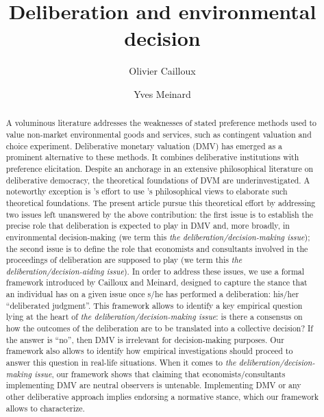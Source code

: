 \documentclass[version=last, pagesize, twoside=off, bibliography=totoc, DIV=calc, fontsize=14pt, a4paper, french, english]{scrartcl}
\newcommand{\institute}[1]{}
\newcommand{\keywords}[1]{}
\begin{document}
\title{Deliberation and environmental decision}
\author{Olivier Cailloux \and Yves Meinard}
\institute{
	Olivier Cailloux 
	\and
	Yves Meinard 
	\at 
	Université Paris-Dauphine, \\
	PSL Research University, \\
	CNRS, \\
	LAMSADE\\
	75016 PARIS, FRANCE\\
	\email{olivier.cailloux@dauphine.fr}
}
\makeatletter
\makeatother
\maketitle

\keywords{decision aid, justification, empirical validation, methodology}

\begin{abstract}
A voluminous literature addresses the weaknesses of stated preference methods used to value non-market environmental goods and services, such as contingent valuation and choice experiment. Deliberative monetary valuation (DMV) has emerged as a prominent alternative to these methods. It combines deliberative institutions with preference elicitation. Despite an anchorage in an extensive philosophical literature on deliberative democracy, the theoretical foundations of DVM are underinvestigated.  A noteworthy exception is \citeauthor{bartkowski_beyond_2018}'s effort to use \citeauthor{sen_idea_2009}'s philosophical views to elaborate such theoretical foundations. The present article pursue this theoretical effort by addressing two issues left unanswered by the above contribution: the first issue is to establish the precise role that deliberation is expected to play in DMV and, more broadly, in environmental decision-making (we term this \emph{the deliberation/decision-making issue}); the second issue is to define the role that economists and consultants involved in the proceedings of deliberation are supposed to play (we term this \emph{the deliberation/decision-aiding issue}). In order to address these issues, we use a formal framework introduced by Cailloux and Meinard, designed to capture the stance that an individual has on a given issue once s/he has performed a deliberation: his/her ``deliberated judgment''. This framework allows to identify a key empirical question lying at the heart of \emph{the deliberation/decision-making issue}: is there a consensus on how the outcomes of the deliberation are to be translated into a collective decision? If the answer is ``no'', then DMV is irrelevant for decision-making purposes.  Our framework also allows to identify how empirical investigations should proceed to answer this question in real-life situations. When it comes to \emph{the deliberation/decision-making issue}, our framework shows that claiming that economists/consultants implementing DMV are neutral observers is untenable. Implementing DMV or any other deliberative approach implies endorsing a normative stance, which our framework allows to characterize.
\end{abstract}
\end{document}

